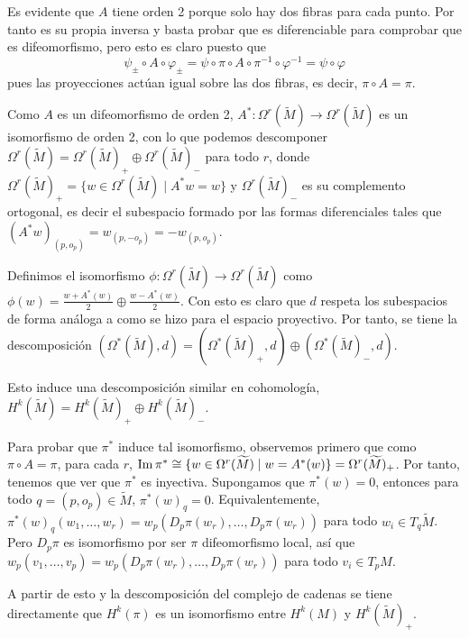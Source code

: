 \documentclass[twoside]{article}
\begin{document}
\begin{solucion}
Es evidente que $A$ tiene orden 2 porque solo hay dos fibras para cada punto. Por tanto es su propia inversa y basta probar que es diferenciable para comprobar que es difeomorfismo, pero esto es claro puesto que $$\psi_{\pm}\circ A\circ\varphi_{\pm}=\psi\circ\pi\circ A\circ \pi^{-1}\circ\varphi^{-1}=\psi\circ\varphi$$
pues las proyecciones actúan igual sobre las dos fibras, es decir, $\pi\circ A=\pi$.

Como $A$ es un difeomorfismo de orden 2, $A^*:\Omega^r(\widetilde{M})\to \Omega^r(\widetilde{M})$ es un isomorfismo de orden 2, con lo que podemos descomponer $\Omega^r(\widetilde{M})=\Omega^r(\widetilde{M})_+\oplus\Omega^r(\widetilde{M})_-$ para todo $r$, donde $\Omega^r(\widetilde{M})_+=\{w\in \Omega^r(\widetilde{M})\mid A^*w=w\}$ y $\Omega^r(\widetilde{M})_-$ es su complemento ortogonal, es decir el subespacio formado por las formas diferenciales tales que $(A^*w)_{(p,o_p)}=w_{(p,-o_p)}=-w_{(p,o_p)}$.

Definimos el isomorfismo $\phi: \Omega^r(\widetilde{M})\to \Omega^r(\widetilde{M})$ como $\phi(w)=\frac{w+A^*(w)}{2}\oplus \frac{w-A^*(w)}{2}$. Con esto es claro que $d$ respeta los subespacios de forma análoga a como se hizo para el espacio proyectivo. Por tanto, se tiene la descomposición $(\Omega^*(\widetilde{M}),d)=(\Omega^*(\widetilde{M})_+,d)\oplus(\Omega^*(\widetilde{M})_-,d).$

Esto induce una descomposición similar en cohomología, $H^k(\widetilde{M})=H^k(\widetilde{M})_+\oplus H^k(\widetilde{M})_-$. 

Para probar que $\pi^*$ induce tal isomorfismo, observemos primero que como $\pi\circ A=\pi$, para cada $r$, $\operatorname{Im}\pi^*\cong \{w\in \Omega^r(\widetilde{M})\mid w=A^*(w)\}=\Omega^r(\widetilde{M})_+$. Por tanto, tenemos que ver que $\pi^*$ es inyectiva. Supongamos que $\pi^*(w)=0$, entonces para todo $q=(p,o_p)\in\widetilde{M}$, $\pi^*(w)_q=0$. Equivalentemente, $\pi^*(w)_q(w_1,\dots, w_r)=w_p(D_p\pi(w_r),\dots, D_p\pi(w_r))$ para todo $w_i\in T_q\widetilde{M}$. Pero $D_p\pi$ es isomorfismo por ser $\pi$ difeomorfismo local, así que $w_p(v_1,\dots, v_p)=w_p(D_p\pi(w_r),\dots, D_p\pi(w_r))$ para todo $v_i\in T_pM$.

A partir de esto y la descomposición del complejo de cadenas se tiene directamente que $H^k(\pi)$ es un isomorfismo entre $H^k(M)$ y $H^k(\widetilde{M})_+$.
\end{solucion}
\end{document}

